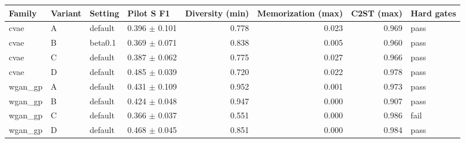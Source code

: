 \begin{tabular}{llllrrrl}
\toprule
Family & Variant & Setting & Pilot S F1 & Diversity (min) & Memorization (max) & C2ST (max) & Hard gates \\
\midrule
cvae & A & default & 0.396 $\pm$ 0.101 & 0.778 & 0.023 & 0.969 & pass \\
cvae & B & beta0.1 & 0.369 $\pm$ 0.071 & 0.838 & 0.005 & 0.960 & pass \\
cvae & C & default & 0.387 $\pm$ 0.062 & 0.775 & 0.027 & 0.966 & pass \\
cvae & D & default & 0.485 $\pm$ 0.039 & 0.720 & 0.022 & 0.978 & pass \\
wgan\_gp & A & default & 0.431 $\pm$ 0.109 & 0.952 & 0.001 & 0.973 & pass \\
wgan\_gp & B & default & 0.424 $\pm$ 0.048 & 0.947 & 0.000 & 0.907 & pass \\
wgan\_gp & C & default & 0.366 $\pm$ 0.037 & 0.551 & 0.000 & 0.986 & fail \\
wgan\_gp & D & default & 0.468 $\pm$ 0.045 & 0.851 & 0.000 & 0.984 & pass \\
\bottomrule
\end{tabular}
